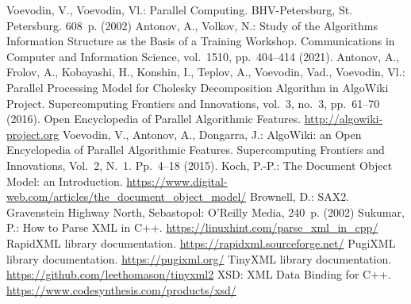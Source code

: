 %
%

\begin{thebibliography}{}




Voevodin, V., Voevodin, Vl.:
Parallel Computing.
BHV-Petersburg, St. Petersburg. 608~p. (2002)
Antonov, A., Volkov, N.:
Study of the Algorithms Information Structure as the Basis of a Training Workshop.
Communications in Computer and Information Science, vol.~1510, pp.~404--414 (2021).
Antonov, A., Frolov, A., Kobayashi, H., Konshin, I., Teplov, A., Voevodin, Vad., Voevodin, Vl.:
Parallel Processing Model for Cholesky Decomposition Algorithm in AlgoWiki Project.
Supercomputing Frontiers and Innovations, vol.~3, no.~3, pp.~61--70 (2016).
Open Encyclopedia of Parallel Algorithmic Features.
\url{http://algowiki-project.org}
Voevodin, V., Antonov, A., Dongarra, J.:
AlgoWiki: an Open Encyclopedia of Parallel Algorithmic Features.
Supercomputing Frontiers and Innovations, Vol.~2, N.~1. Pp.~4--18 (2015).
Koch, P.-P.:
The Document Object Model: an Introduction. \url{https://www.digital-web.com/articles/the\_document\_object\_model/}
Brownell, D.:
SAX2. Gravenstein Highway North, Sebastopol: O’Reilly Media, 240~p. (2002)
Sukumar, P.:
How to Parse XML in C++. \url{https://linuxhint.com/parse\_xml\_in\_cpp/}
RapidXML library documentation. \url{https://rapidxml.sourceforge.net/}
PugiXML library documentation. \url{https://pugixml.org/}
TinyXML library documentation. \url{https://github.com/leethomason/tinyxml2}
XSD: XML Data Binding for C++. \url{https://www.codesynthesis.com/products/xsd/}

\end{thebibliography}
